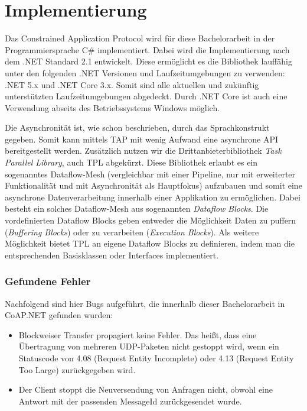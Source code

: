 \section{Implementierung}
\label{sec:implementierung}

Das Constrained Application Protocol wird für diese Bachelorarbeit in der Programmiersprache C\# implementiert. Dabei wird die Implementierung nach dem .NET Standard 2.1 entwickelt. Diese ermöglicht es die Bibliothek lauffähig unter den folgenden .NET Versionen und Laufzeitumgebungen zu verwenden: .NET 5.x und .NET Core 3.x. Somit sind alle aktuellen und zukünftig unterstützten Laufzeitumgebungen abgedeckt. Durch .NET Core ist auch eine Verwendung abseits des Betriebssystems Windows möglich.

Die Asynchronität ist, wie schon beschrieben, durch das Sprachkonstrukt gegeben. Somit kann mittels TAP mit wenig Aufwand eine asynchrone API bereitgestellt werden. Zusätzlich nutzen wir die Drittanbieterbibliothek \textit{Task Parallel Library}, auch TPL abgekürzt. Diese Bibliothek erlaubt es ein sogenanntes Dataflow-Mesh (vergleichbar mit einer Pipeline, nur mit erweiterter Funktionalität und mit Asynchronität als Hauptfokus) aufzubauen und somit eine asynchrone Datenverarbeitung innerhalb einer Applikation zu ermöglichen. Dabei besteht ein solches Dataflow-Mesh aus sogenannten \textit{Dataflow Blocks}. Die vordefinierten Dataflow Blocks geben entweder die Möglichkeit Daten zu puffern (\textit{Buffering Blocks}) oder zu verarbeiten (\textit{Execution Blocks}). Als weitere Möglichkeit bietet TPL an eigene Dataflow Blocks zu definieren, indem man die entsprechenden Basisklassen oder Interfaces implementiert.

\subsubsection{Gefundene Fehler}
\label{subsubsec:gefundende-fehler}

Nachfolgend sind hier Bugs aufgeführt, die innerhalb dieser Bachelorarbeit in CoAP.NET gefunden wurden:
\begin{itemize}
    \item Blockweiser Transfer propagiert keine Fehler. Das heißt, dass eine Übertragung von mehreren UDP-Paketen nicht gestoppt wird, wenn ein Statuscode von 4.08 (Request Entity Incomplete) oder 4.13 (Request Entity Too Large) zurückgegeben wird.
    \item Der Client stoppt die Neuversendung von Anfragen nicht, obwohl eine Antwort mit der passenden MessageId zurückgesendet wurde.
\end{itemize}

